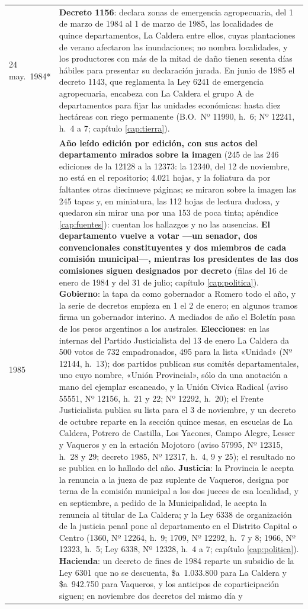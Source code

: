 \begin{longtable}{@{}p{2.7cm}p{10.3cm}@{}}
24 may.\ 1984* & \textbf{Decreto 1156}: declara zonas de emergencia agropecuaria, del 1 de marzo de 1984 al 1 de marzo de 1985, las localidades de quince departamentos, La Caldera entre ellos, cuyas plantaciones de verano afectaron las inundaciones; no nombra localidades, y los productores con más de la mitad de daño tienen sesenta días hábiles para presentar su declaración jurada. En junio de 1985 el decreto 1143, que reglamenta la Ley 6241 de emergencia agropecuaria, encabeza con La Caldera el grupo A de departamentos para fijar las unidades económicas: hasta diez hectáreas con riego permanente (B.O.\ Nº 11990, h.\ 6; Nº 12241, h.\ 4 a 7; capítulo \ref{cap:tierra}). \\
1985 & \textbf{Año leído edición por edición, con sus actos del departamento mirados sobre la imagen} (245 de las 246 ediciones de la 12128 a la 12373: la 12340, del 12 de noviembre, no está en el repositorio; 4.021 hojas, y la foliatura da por faltantes otras diecinueve páginas; se miraron sobre la imagen las 245 tapas y, en miniatura, las 112 hojas de lectura dudosa, y quedaron sin mirar una por una 153 de poca tinta; apéndice \ref{cap:fuentes}): cuentan los hallazgos y no las ausencias. \textbf{El departamento vuelve a votar ---un senador, dos convencionales constituyentes y dos miembros de cada comisión municipal---, mientras los presidentes de las dos comisiones siguen designados por decreto} (filas del 16 de enero de 1984 y del 31 de julio; capítulo \ref{cap:politica}). \textbf{Gobierno}: la tapa da como gobernador a Romero todo el año, y la serie de decretos empieza en 1 el 2 de enero; en algunos tramos firma un gobernador interino. A mediados de año el Boletín pasa de los pesos argentinos a los australes. \textbf{Elecciones}: en las internas del Partido Justicialista del 13 de enero La Caldera da 500 votos de 732 empadronados, 495 para la lista «Unidad» (Nº 12144, h.\ 13); dos partidos publican sus comités departamentales, uno cuyo nombre, «Unión Provincial», sólo da una anotación a mano del ejemplar escaneado, y la Unión Cívica Radical (aviso 55551, Nº 12156, h.\ 21 y 22; Nº 12292, h.\ 20); el Frente Justicialista publica su lista para el 3 de noviembre, y un decreto de octubre reparte en la sección quince mesas, en escuelas de La Caldera, Potrero de Castilla, Los Yacones, Campo Alegre, Lesser y Vaqueros y en la estación Mojotoro (aviso 57995, Nº 12315, h.\ 28 y 29; decreto 1985, Nº 12317, h.\ 4, 9 y 25); el resultado no se publica en lo hallado del año. \textbf{Justicia}: la Provincia le acepta la renuncia a la jueza de paz suplente de Vaqueros, designa por terna de la comisión municipal a los dos jueces de esa localidad, y en septiembre, a pedido de la Municipalidad, le acepta la renuncia al titular de La Caldera; y la Ley 6338 de organización de la justicia penal pone al departamento en el Distrito Capital o Centro (1360, Nº 12264, h.\ 9; 1709, Nº 12292, h.\ 7 y 8; 1966, Nº 12323, h.\ 5; Ley 6338, Nº 12328, h.\ 4 a 7; capítulo \ref{cap:politica}). \textbf{Hacienda}: un decreto de fines de 1984 reparte un subsidio de la Ley 6301 que no se descuenta, \$a~1.033.800 para La Caldera y \$a~942.750 para Vaqueros, y los anticipos de coparticipación siguen; en noviembre dos decretos del mismo día y 
\end{longtable}

